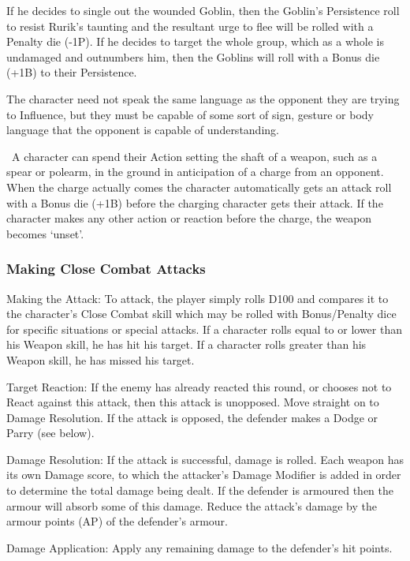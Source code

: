 \begin{description}
\begin{rpg-examplebox}
If he decides to single out the wounded Goblin, then the Goblin’s Persistence roll to resist Rurik’s taunting and the resultant urge to flee will be rolled with a Penalty die (-1P). If he decides to target the whole group, which as a whole is undamaged and outnumbers him, then the Goblins will roll with a Bonus die (+1B) to their Persistence. 
	\end{rpg-examplebox}

The character need not speak the same language as the opponent they are trying to Influence, but they must be capable of some sort of sign, gesture or body language that the opponent is capable of understanding.

	\item[Set Weapon:]  A character can spend their Action setting the shaft of a weapon, such as a spear or polearm, in the ground in anticipation of a charge from an opponent. When the charge actually comes the character automatically gets an attack roll with a Bonus die (+1B) before the charging character gets their attack. If the character makes any other action or reaction before the charge, the weapon becomes ‘unset’.
\end{description}


\subsubsection{Making Close Combat Attacks}
\begin{rpg-list}
\item Making the Attack: To attack, the player simply rolls D100 and compares it to the character’s Close Combat skill which may be rolled with Bonus/Penalty dice for specific situations or special attacks. If a character rolls equal to or lower than his Weapon skill, he has hit his target. If a character rolls greater than his Weapon skill, he has missed his target. 

\item Target Reaction: If the enemy has already reacted this round, or chooses not to React against this attack, then this attack is unopposed. Move straight on to Damage Resolution. If the attack is opposed, the defender makes a Dodge or Parry (see below).

\item Damage Resolution: If the attack is successful, damage is rolled. Each weapon has its own Damage score, to which the attacker’s Damage Modifier is added in order to determine the total damage being dealt. If the defender is armoured then the armour will absorb some of this damage. Reduce the attack’s damage by the armour points (AP) of the defender’s armour. 

\item Damage Application: Apply any remaining damage to the defender’s hit points. 
\end{rpg-list}

